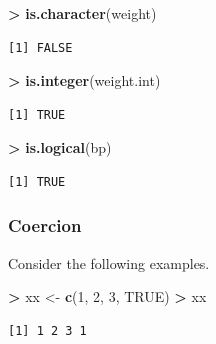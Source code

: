 \documentclass[
]{krantz}
\makeatletter
\newenvironment{Shaded}{\begin{snugshade}}{\end{snugshade}}
\newcommand{\DecValTok}[1]{\textcolor[rgb]{0.06,0.06,0.06}{#1}}
\newcommand{\KeywordTok}[1]{\textcolor[rgb]{0.27,0.27,0.27}{\textbf{#1}}}
\newcommand{\NormalTok}[1]{#1}
\newcommand{\OperatorTok}[1]{\textcolor[rgb]{0.43,0.43,0.43}{\textbf{#1}}}
\newcommand{\OtherTok}[1]{\textcolor[rgb]{0.37,0.37,0.37}{#1}}
\newcommand{\StringTok}[1]{\textcolor[rgb]{0.5,0.5,0.5}{#1}}
\newenvironment{kframe}{%
\medskip{}
\setlength{\fboxsep}{.8em}
 \def\at@end@of@kframe{}%
 \ifinner\ifhmode%
  \def\at@end@of@kframe{\end{minipage}}%
  \begin{minipage}{\columnwidth}%
 \fi\fi%
 \def\FrameCommand##1{\hskip\@totalleftmargin \hskip-\fboxsep
 \colorbox{shadecolor}{##1}\hskip-\fboxsep
     \hskip-\linewidth \hskip-\@totalleftmargin \hskip\columnwidth}%
 \MakeFramed {\advance\hsize-\width
   \@totalleftmargin\z@ \linewidth\hsize
   \@setminipage}}%
 {\par\unskip\endMakeFramed%
 \at@end@of@kframe}
\renewenvironment{Shaded}{\begin{kframe}}{\end{kframe}}
\makeatother
\begin{document}
\begin{Shaded}
\begin{Highlighting}[]
\OperatorTok{\textgreater{}}\StringTok{ }\KeywordTok{is.character}\NormalTok{(weight)}
\end{Highlighting}
\end{Shaded}

\begin{verbatim}
[1] FALSE
\end{verbatim}

\begin{Shaded}
\begin{Highlighting}[]
\OperatorTok{\textgreater{}}\StringTok{ }\KeywordTok{is.integer}\NormalTok{(weight.int)}
\end{Highlighting}
\end{Shaded}

\begin{verbatim}
[1] TRUE
\end{verbatim}

\begin{Shaded}
\begin{Highlighting}[]
\OperatorTok{\textgreater{}}\StringTok{ }\KeywordTok{is.logical}\NormalTok{(bp)}
\end{Highlighting}
\end{Shaded}

\begin{verbatim}
[1] TRUE
\end{verbatim}

\hypertarget{coercion}{%
\subsubsection{Coercion}\label{coercion}}

Consider the following examples.

\begin{Shaded}
\begin{Highlighting}[]
\OperatorTok{\textgreater{}}\StringTok{ }\NormalTok{xx \textless{}{-}}\StringTok{ }\KeywordTok{c}\NormalTok{(}\DecValTok{1}\NormalTok{, }\DecValTok{2}\NormalTok{, }\DecValTok{3}\NormalTok{, }\OtherTok{TRUE}\NormalTok{)}
\OperatorTok{\textgreater{}}\StringTok{ }\NormalTok{xx}
\end{Highlighting}
\end{Shaded}

\begin{verbatim}
[1] 1 2 3 1
\end{verbatim}
\end{document}
